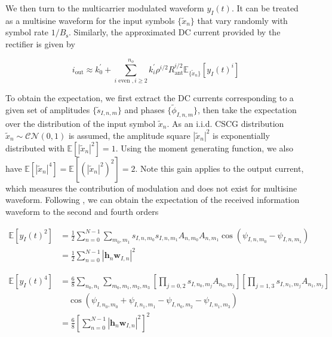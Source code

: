 We then turn to the multicarrier modulated waveform ${y_I}(t)$. It can be treated as a multisine waveform for the input symbols $\{ {{\tilde x}_n}\} $ that vary randomly with symbol rate $1/{B_{\text{s}}}$. Similarly, the approximated DC current provided by the rectifier is given by

\begin{equation}\label{eqn:current_information}
  {i_{\text{out}}} \approx k_0^\prime  + \sum\limits_{i{\text{ even }},i \geqslant 2}^{{n_o}} {k_i^\prime } {\rho ^{i/2}}R_{\text{ant}}^{i/2}{\mathbb{E}_{\{ {{\tilde x}_n}\} }}\left[ {{y_I}{{(t)}^i}} \right]
\end{equation}

To obtain the expectation, we first extract the DC currents corresponding to a given set of amplitudes $\{ {{\tilde s}_{I,n,m}}\} $ and phases $\{ {{\tilde \phi }_{I,n,m}}\} $, then take the expectation over the distribution of the input symbol ${{\tilde x}_n}$. As an i.i.d. CSCG distribution ${{\tilde x}_n}\sim\mathcal{C}\mathcal{N}(0,1)$ is assumed, the amplitude square ${\left| {{{\tilde x}_n}} \right|^2}$ is exponentially distributed with $\mathbb{E}\left[ {{{\left| {{{\tilde x}_n}} \right|}^2}} \right] = 1$. Using the moment generating function, we also have $\mathbb{E}\left[ {{{\left| {{{\tilde x}_n}} \right|}^4}} \right] = \mathbb{E}\left[ {{{\left( {{{\left| {{{\tilde x}_n}} \right|}^2}} \right)}^2}} \right] = 2$. Note this gain applies to the output current, which measures the contribution of modulation and does not exist for multisine waveform. Following \cite{Clerckx2018}, we can obtain the expectation of the received information waveform to the second and fourth orders

\begin{align}\label{eqn:information_waveform_second_order}
  \mathbb{E}\left[ {{y_I}{{(t)}^2}} \right] &= \frac{1}{2}\sum\limits_{n = 0}^{N - 1} {\sum\limits_{{m_0},{m_1}} {{s_{I,n,{m_0}}}} } {s_{I,n,{m_1}}}{A_{n,{m_0}}}{A_{n,{m_1}}}\cos \left( {{\psi _{I,n,{m_0}}} - {\psi _{I,n,{m_1}}}} \right) \\
   &= \frac{1}{2}\sum\limits_{n = 0}^{N - 1} {{{\left| {{{\mathbf{h}}_n}{{\mathbf{w}}_{I,n}}} \right|}^2}}
\end{align}

\begin{align}\label{eqn:information_waveform_fourth_order}
  \mathbb{E}\left[ {{y_I}{{(t)}^4}} \right] &= \frac{6}{8}\sum\limits_{{n_0},{n_1}} {\sum\limits_{{m_0},{m_1},{m_2},{m_3}} {\left[ {\prod\limits_{j = 0,2} {{s_{I,{n_0},{m_j}}}{A_{{n_0},{m_j}}}} } \right]\left[ {\prod\limits_{j = 1,3} {{s_{I,{n_1},{m_j}}}{A_{{n_1},{m_j}}}} } \right]} } \nonumber \\
   &\quad \cos \left( {{\psi _{I,{n_0},{m_0}}} + {\psi _{I,{n_1},{m_1}}} - {\psi _{I,{n_0},{m_2}}} - {\psi _{I,{n_1},{m_3}}}} \right) \\
   &= \frac{6}{8}{\left[ {\sum\limits_{n = 0}^{N - 1} {{{\left| {{{\mathbf{h}}_n}{{\mathbf{w}}_{I,n}}} \right|}^2}} } \right]^2} \label{eqn:waveform_end}
\end{align}

